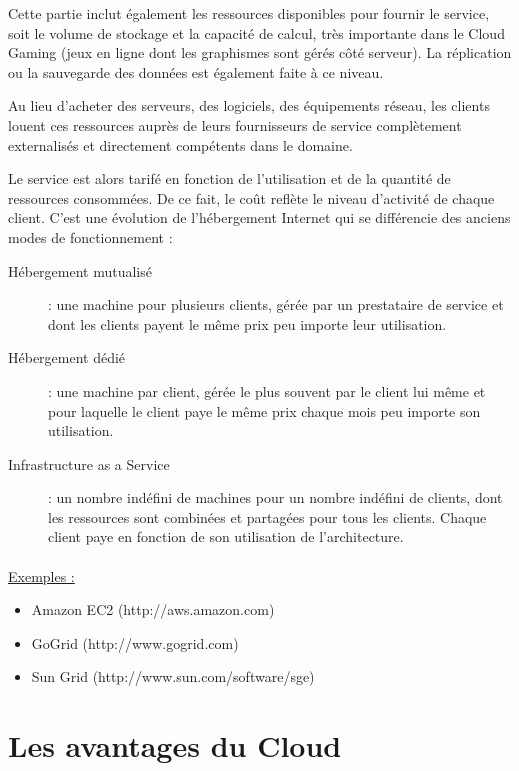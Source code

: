\documentclass[a4paper,12pt]{report}
\begin{document}
\begin{onehalfspace}
	Cette partie inclut également les ressources disponibles pour fournir le service, soit le volume de stockage et la capacité de calcul, très importante dans le Cloud Gaming (jeux en ligne dont les graphismes sont gérés côté serveur). La réplication ou la sauvegarde des données est également faite à ce niveau.
	
	Au lieu d’acheter des serveurs, des logiciels, des équipements réseau, les clients louent ces ressources auprès de leurs fournisseurs de service complètement externalisés et directement compétents dans le domaine.
	
	Le service est alors tarifé en fonction de l'utilisation et de la quantité de ressources consommées. De ce fait, le coût reflète le niveau d'activité de chaque client. C'est une évolution de l'hébergement Internet qui se différencie des anciens modes de fonctionnement :
	
	\begin{description}
		\item[Hébergement mutualisé] : une machine pour plusieurs clients, gérée par un prestataire de service et dont les clients payent le même prix peu importe leur utilisation.
		\item[Hébergement dédié] : une machine par client, gérée le plus souvent par le client lui même et pour laquelle le client paye le même prix chaque mois peu importe son utilisation.
		\item[Infrastructure as a Service] : un nombre indéfini de machines pour un nombre indéfini de clients, dont les ressources sont combinées et partagées pour tous les clients. Chaque client paye en fonction de son utilisation de l'architecture.
	\end{description}
	
	\paragraph*{}
	\underline{Exemples :}
	\begin{itemize}
		\item Amazon EC2 (http://aws.amazon.com)
		\item GoGrid (http://www.gogrid.com)
		\item Sun Grid (http://www.sun.com/software/sge)
	\end{itemize}
	
	\section{Les avantages du Cloud}
	

\end{onehalfspace}
\end{document}
